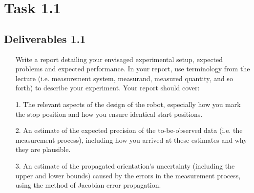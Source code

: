 

    \chapter{Task 1.1}
    \section{Deliverables 1.1}
    \begin{itemize}
        \item[] Write a report detailing your envisaged experimental setup, expected problems and expected performance. In your report, use terminology from the lecture (i.e. measurement system, measurand, measured quantity, and so forth) to describe your experiment. Your report should cover:
    \end{itemize}
    
    \begin{itemize}
        \item[1.] The relevant aspects of the design of the robot, especially how you mark the stop position and how you ensure identical start positions.
        \item[2.] An estimate of the expected precision of the to-be-observed data (i.e. the measurement process), including how you arrived at these estimates and why they are plausible.
        \item[3.] An estimate of the propagated orientation’s uncertainty (including the upper and lower bounds) caused by the errors in the measurement process, using the method of Jacobian error propagation.
    \end{itemize}
    
